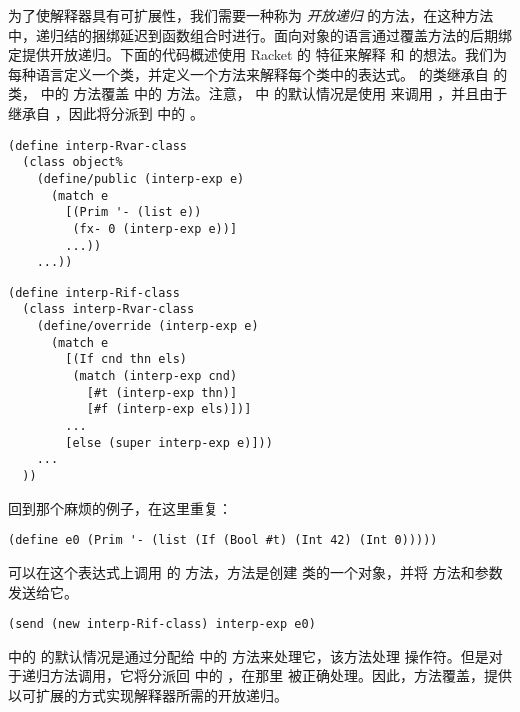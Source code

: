 \documentclass[11pt]{book}
\begin{document}
为了使解释器具有可扩展性，我们需要一种称为
\emph{开放递归} 的方法，在这种方法中，递归结的捆绑延迟到函数组合时进行。面向对象的语言通过覆盖方法的后期绑定提供开放递归。下面的代码概述使用 Racket 的
\href{https://docs.racket-lang.org/guide/classes.html}{}
 特征来解释 \LangVar{} 和
\LangIf{} 的想法。我们为每种语言定义一个类，并定义一个方法来解释每个类中的表达式。 \LangIf{} 的类继承自 \LangVar{}
的类， \LangIf{} 中的  方法覆盖 \LangVar{} 中的 方法。注意， \LangIf{} 中
 的默认情况是使用  来调用
 ，并且由于 \LangIf{} 继承自 \LangVar{} ，因此将分派到 \LangVar{} 中的  。
\begin{center}
\begin{minipage}{0.45\textwidth}
\begin{lstlisting}
(define interp-Rvar-class
  (class object%
    (define/public (interp-exp e)
      (match e
        [(Prim '- (list e))
         (fx- 0 (interp-exp e))]
        ...))
    ...))
\end{lstlisting}
\end{minipage}
\begin{minipage}{0.45\textwidth}
  \begin{lstlisting}
(define interp-Rif-class
  (class interp-Rvar-class
    (define/override (interp-exp e)
      (match e
        [(If cnd thn els)
         (match (interp-exp cnd)
           [#t (interp-exp thn)]
           [#f (interp-exp els)])]
        ...
        [else (super interp-exp e)]))
    ...
  ))
\end{lstlisting}
\end{minipage}
\end{center}
回到那个麻烦的例子，在这里重复：
\begin{lstlisting}
(define e0 (Prim '- (list (If (Bool #t) (Int 42) (Int 0)))))
\end{lstlisting}
可以在这个表达式上调用 \LangIf{} 的 方法，方法是创建 \LangIf{} 类的一个对象，并将
 方法和参数  发送给它。
\begin{lstlisting}
(send (new interp-Rif-class) interp-exp e0)
\end{lstlisting}
\LangIf{} 中的  的默认情况是通过分配给 \LangVar{} 中的 方法来处理它，该方法处理 \code{-} 操作符。但是对于递归方法调用，它将分派回 \LangIf{} 中的  ，在那里
 被正确处理。因此，方法覆盖，提供以可扩展的方式实现解释器所需的开放递归。
\end{document}
